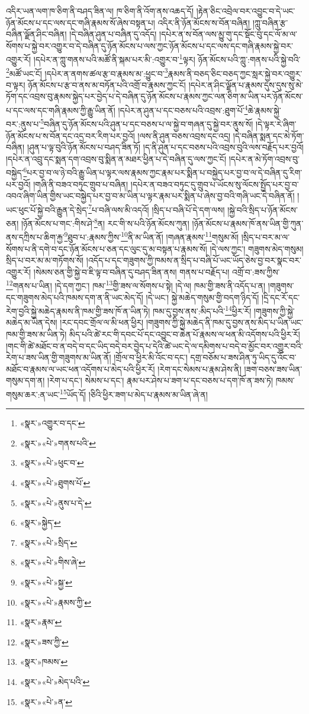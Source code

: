 འདིར་ཡན་ལག་ཁ་ཅིག་ནི་བཤད་ཟིན་ལ། ཁ་ཅིག་ནི་འོག་ནས་འཆད་དོ། །རྟེན་ཅིང་འབྲེལ་བར་འབྱུང་བ་དེ་ཡང་ཉོན་མོངས་པ་དང་ལས་དང་གཞི་རྣམས་སོ་ཞེས་བསྟན་པ། འདིར་ནི་ཉོན་མོངས་ས་བོན་བཞིན། །ཀླུ་བཞིན་རྩ་བཞིན་ལྗོན་ཤིང་བཞིན། །དེ་བཞིན་ཤུན་པ་བཞིན་དུ་འདོད། །དཔེར་ན་ས་བོན་ལས་མྱུ་གུ་དང་སྡོང་བུ་དང་ལོ་མ་ལ་སོགས་པ་སྐྱེ་བར་འགྱུར་བ་དེ་བཞིན་དུ་ཉོན་མོངས་པ་ལས་ཀྱང་ཉོན་མོངས་པ་དང་ལས་དང་གཞི་རྣམས་སྐྱེ་བར་འགྱུར་རོ། །དཔེར་ན་ཀླུ་གནས་པའི་མཚོ་ནི་སྐམ་པར་མི་:འགྱུར་བ་\footnote{«སྣར་»འགྱུར་བ་དང་}ལྟར། ཉོན་མོངས་པའི་ཀླུ་:གནས་པའི་སྐྱེ་བའི་\footnote{«སྣར་»«པེ་»གནས་པའི་}མཚོ་ཡང་ངོ། །དཔེར་ན་ནགས་ཚལ་རྩ་བ་རྣམས་མ་:ཕྱུང་བ་\footnote{«སྣར་»«པེ་»ཕུང་བ་}རྣམས་ནི་བཅད་ཅིང་བཅད་ཀྱང་སླར་སྐྱེ་བར་འགྱུར་བ་ལྟར། ཉོན་མོངས་པ་རྩ་བ་ནས་མ་བཏོན་པའི་འགྲོ་བ་རྣམས་ཀྱང་ངོ། །དཔེར་ན་ཤིང་ལྗོན་པ་རྣམས་དུས་དུས་སུ་མེ་ཏོག་དང་འབྲས་བུ་རྣམས་སྐྱེད་པར་བྱེད་པ་དེ་བཞིན་དུ་ཉོན་མོངས་པ་རྣམས་ཀྱང་ལན་ཅིག་མ་ཡིན་པར་ཉོན་མོངས་པ་དང་ལས་དང་གཞི་རྣམས་ཀྱི་རྒྱུ་ཡིན་ནོ། །དཔེར་ན་ཤུན་པ་དང་བཅས་པའི་འབྲས་:ཐུག་པོ་\footnote{«སྣར་»«པེ་»ཐུགས་པོ་}ཆེ་རྣམས་སྐྱེ་བར་:ནུས་པ་\footnote{«སྣར་»«པེ་»ནུས་པ་དེ་}བཞིན་དུ་ཉོན་མོངས་པའི་ཤུན་པ་དང་བཅས་པ་ལ་སྐྱེ་བ་གཞན་དུ་སྐྱེ་བར་ནུས་སོ། །དེ་ལྟར་རེ་ཞིག་ཉོན་མོངས་པ་ས་བོན་དང་འདྲ་བར་རིག་པར་བྱའོ། །ལས་ནི་ཤུན་བཅས་འབྲས་དང་འདྲ། །དེ་བཞིན་སྨན་དང་མེ་ཏོག་བཞིན། །ཤུན་པ་ལྟ་བུའི་ཉོན་མོངས་པ་བཤད་ཟིན་ཏོ། །ད་ནི་ཤུན་པ་དང་བཅས་པའི་འབྲས་བུའི་ལས་བརྗོད་པར་བྱའོ། །དཔེར་ན་འབྲུ་དང་སྨན་དག་འབྲས་བུ་སྨིན་ན་མཐར་ཕྱིན་པ་དེ་བཞིན་དུ་ལས་ཀྱང་ངོ། །དཔེར་ན་མེ་ཏོག་འབྲས་བུ་བསྐྱེད་\footnote{«སྣར་»སྐྱེད་}པར་བྱ་བ་ལ་ཉེ་བའི་རྒྱུ་ཡིན་པ་ལྟར་ལས་རྣམས་ཀྱང་རྣམ་པར་སྨིན་པ་བསྐྱེད་པར་བྱ་བ་ལ་དེ་བཞིན་དུ་རིག་པར་བྱའོ། །གཞི་ནི་བཟའ་བཏུང་གྲུབ་པ་བཞིན། །དཔེར་ན་བཟའ་བཏུང་དུ་གྲུབ་པ་ཡོངས་སུ་ལོངས་སྤྱོད་པར་བྱ་བ་འབའ་ཞིག་ཡིན་གྱིས་ཡང་བསྐྱེད་པར་བྱ་བ་མ་ཡིན་པ་ལྟར་རྣམ་པར་སྨིན་པ་ཞེས་བྱ་བའི་གཞི་ཡང་དེ་བཞིན་ནོ། །ཡང་ཕུང་པོ་སྐྱེ་བའི་རྒྱུན་དེ་སྲེད་\footnote{«སྣར་»«པེ་»སྲིད་}པ་བཞི་ལས་མི་འདའོ། །སྲིད་པ་བཞི་པོ་དེ་དག་ལས། །སྐྱེ་བའི་སྲིད་པ་ཉོན་མོངས་ཅན། །ཉོན་མོངས་པ་གང་:གིས་ཤེ་\footnote{«སྣར་»«པེ་»གིས་ཞེ་}ན། རང་གི་ས་པའི་ཉོན་མོངས་ཀུན། །ཉོན་མོངས་པ་རྣམས་ཁོ་ནས་ཡིན་གྱི་ཀུན་ནས་དཀྲིས་པ་ཆིག་རྐྱ་\footnote{«སྣར་»«པེ་»སྐྱ་}ཐུབ་པ་:རྣམས་ཀྱིས་\footnote{«སྣར་»«པེ་»རྣམས་ཀྱི་}ནི་མ་ཡིན་ནོ། །གཞན་རྣམས་\footnote{«སྣར་»རྣམ་}གསུམ་མོ། །སྲིད་པ་བར་མ་ལ་སོགས་པ་ནི་དགེ་བ་དང་ཉོན་མོངས་པ་ཅན་དང་ལུང་དུ་མ་བསྟན་པ་རྣམས་སོ། །དེ་ལས་ཀྱང་། གཟུགས་མེད་གསུམ། སྲིད་པ་བར་མ་མ་གཏོགས་སོ། །འདོད་པ་དང་གཟུགས་ཀྱི་ཁམས་ན་སྲིད་པ་བཞི་པོ་ཡང་ཡོད་ཅེས་བྱ་བར་སྣང་བར་འགྱུར་རོ། །སེམས་ཅན་གྱི་སྐྱེ་བ་ཇི་ལྟ་བ་བཞིན་དུ་བཤད་ཟིན་ནས། གནས་པ་བརྗོད་པ། འགྲོ་བ་:ཟས་ཀྱིས་\footnote{«སྣར་»ཟས་ཀྱི་}གནས་པ་ཡིན། །དེ་དག་ཀྱང་། ཁམ་\footnote{«སྣར་»ཁམས་}གྱི་ཟས་ལ་སོགས་པ་སྟེ། །དེ་ལ། ཁམ་གྱི་ཟས་ནི་འདོད་པ་ན། །གཟུགས་དང་གཟུགས་མེད་པའི་ཁམས་དག་ན་ནི་ཡང་མེད་དོ། །དེ་ཡང་། སྐྱེ་མཆེད་གསུམ་གྱི་བདག་ཉིད་དོ། །དྲི་དང་རོ་དང་རེག་བྱའི་སྐྱེ་མཆེད་རྣམས་ནི་ཁམ་གྱི་ཟས་ཁོ་ན་ཡིན་ཏེ། ཁམ་དུ་བྱས་ནས་:མིད་པའི་\footnote{«སྣར་»«པེ་»མེད་པའི་}ཕྱིར་རོ། །གཟུགས་ཀྱི་སྐྱེ་མཆེད་མ་ཡིན་དེས། །རང་དབང་གྲོལ་ལ་མི་ཕན་ཕྱིར། །གཟུགས་ཀྱི་སྐྱེ་མཆེད་ནི་ཁམ་དུ་བྱས་ནས་མིད་པ་ཡིན་ཡང་ཁམ་གྱི་ཟས་མ་ཡིན་ཏེ། མིད་པའི་ཚེ་རང་གི་དབང་པོ་དང་འབྱུང་བ་ཆེན་པོ་རྣམས་ལ་ཕན་མི་འདོགས་པའི་ཕྱིར་རོ། །གང་གི་ཚེ་མཐོང་བ་ན་བདེ་བ་དང་ཡིད་བདེ་བར་བྱེད་པ་དེའི་ཚེ་ཡང་དེ་ལ་དམིགས་པ་བདེ་བ་མྱོང་བར་འགྱུར་བའི་རེག་པ་ཟས་ཡིན་གྱི་གཟུགས་མ་ཡིན་ནོ། །གྲོལ་བ་ཕྱིར་མི་འོང་བ་དང་། དགྲ་བཅོམ་པ་ཟས་ཤིན་ཏུ་ཡིད་དུ་འོང་བ་མཐོང་བ་རྣམས་ལ་ཡང་ཕན་འདོགས་པ་མེད་པའི་ཕྱིར་རོ། །རེག་དང་སེམས་པ་རྣམ་ཤེས་ནི། །ཟག་བཅས་ཟས་ཡིན་གསུམ་དག་ན། །རེག་པ་དང་། སེམས་པ་དང་། རྣམ་པར་ཤེས་པ་ཟག་པ་དང་བཅས་པ་དག་ཁོ་ན་ཟས་ཏེ། ཁམས་གསུམ་ཆར་:ན་ཡང་\footnote{«སྣར་»«པེ་»ན་}ཡོད་དོ། །ཅིའི་ཕྱིར་ཟག་པ་མེད་པ་རྣམས་མ་ཡིན་ཞེ་ན། 